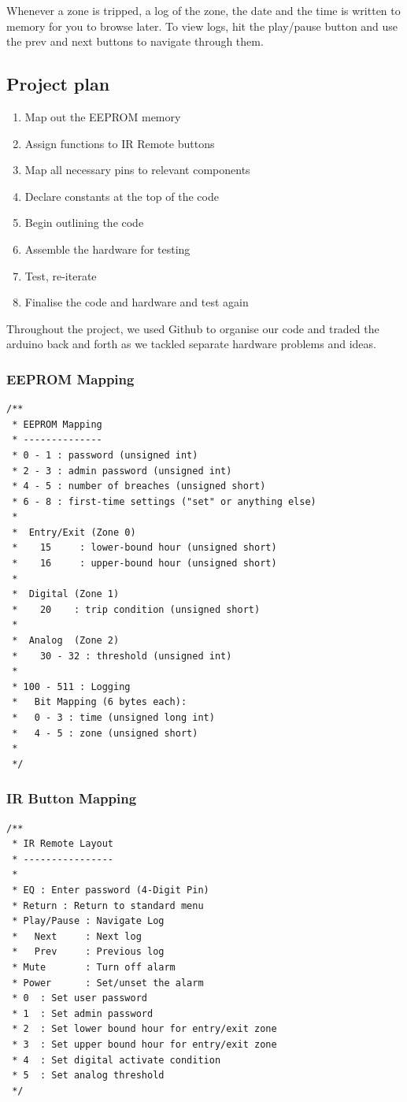 \documentclass[a4paper,11pt]{article}
\theoremstyle{mytheor}
\begin{document}
Whenever a zone is tripped, a log of the zone, the date and the time is written to memory for you to browse later. To view logs, hit the play/pause button and use the prev and next buttons to navigate through them.


\subsection{Project plan}
\begin{enumerate}
    \item Map out the EEPROM memory
    \item Assign functions to IR Remote buttons
    \item Map all necessary pins to relevant components
    \item Declare constants at the top of the code
    \item Begin outlining the code
    \item Assemble the hardware for testing
    \item Test, re-iterate
    \item Finalise the code and hardware and test again
\end{enumerate}

Throughout the project, we used Github to organise our code and traded the arduino back and forth as we tackled separate hardware problems and ideas.

\subsubsection{EEPROM Mapping}
\begin{lstlisting}
/**
 * EEPROM Mapping
 * --------------
 * 0 - 1 : password (unsigned int)
 * 2 - 3 : admin password (unsigned int)
 * 4 - 5 : number of breaches (unsigned short)
 * 6 - 8 : first-time settings ("set" or anything else)
 *
 *  Entry/Exit (Zone 0)
 *    15     : lower-bound hour (unsigned short)
 *    16     : upper-bound hour (unsigned short)
 *
 *  Digital (Zone 1)
 *    20    : trip condition (unsigned short)
 *    
 *  Analog  (Zone 2)
 *    30 - 32 : threshold (unsigned int)
 *
 * 100 - 511 : Logging
 *   Bit Mapping (6 bytes each):
 *   0 - 3 : time (unsigned long int)
 *   4 - 5 : zone (unsigned short)
 *   
 */
\end{lstlisting}

\subsubsection{IR Button Mapping}
\begin{lstlisting}
/**
 * IR Remote Layout
 * ----------------
 *
 * EQ : Enter password (4-Digit Pin)
 * Return : Return to standard menu
 * Play/Pause : Navigate Log
 *   Next     : Next log
 *   Prev     : Previous log
 * Mute       : Turn off alarm
 * Power      : Set/unset the alarm
 * 0  : Set user password
 * 1  : Set admin password
 * 2  : Set lower bound hour for entry/exit zone
 * 3  : Set upper bound hour for entry/exit zone
 * 4  : Set digital activate condition
 * 5  : Set analog threshold
 */
\end{lstlisting}
\end{document}

